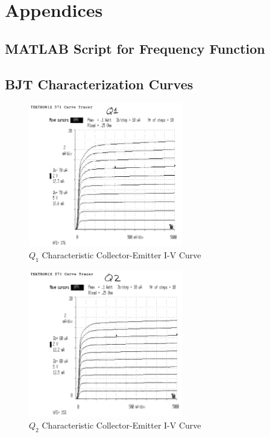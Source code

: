 \documentclass[titlepage, letterpaper, 10.5pt]{article}
\begin{document}
\clearpage
\section{Appendices}
\subsection{MATLAB Script for Frequency Function}
\label{matlab-plotting-script}


\clearpage
\subsection{BJT Characterization Curves}
\label{bjt-appendix}

\begin{figure}[ht]
	\centering
	\includegraphics[width=0.6\textwidth]{results/q1-characteristics}
	\caption{$Q_{1}$ Characteristic Collector-Emitter I-V Curve}
\end{figure}

\begin{figure}[ht]
	\centering
	\includegraphics[width=0.6\textwidth]{results/q2-characteristics}
	\caption{$Q_{2}$ Characteristic Collector-Emitter I-V Curve}
\end{figure}
\end{document}
